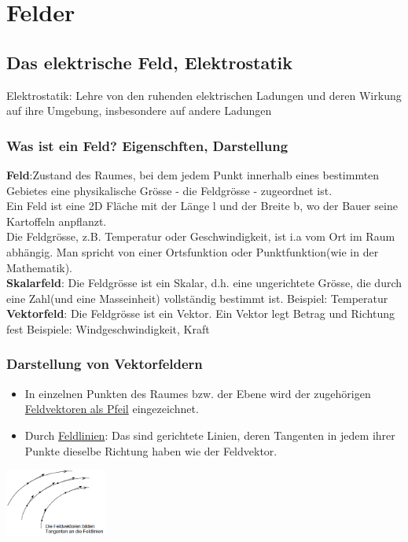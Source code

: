 \section{Felder}
\subsection{Das elektrische Feld, Elektrostatik}
Elektrostatik: Lehre von den ruhenden elektrischen Ladungen und deren Wirkung auf ihre Umgebung, insbesondere auf andere Ladungen\\
\subsubsection{Was ist ein Feld? Eigenschften, Darstellung}
\textbf{Feld}:Zustand des Raumes, bei dem jedem Punkt innerhalb eines bestimmten Gebietes eine physikalische Grösse - die Feldgrösse - zugeordnet ist.\\
Ein Feld ist eine 2D Fläche mit der Länge l und der Breite b, wo der Bauer seine Kartoffeln anpflanzt.\\
Die Feldgrösse, z.B. Temperatur oder Geschwindigkeit, ist i.a vom Ort im Raum abhängig. Man spricht von einer Ortsfunktion oder Punktfunktion(wie in der Mathematik).\\
\textbf{Skalarfeld}: Die Feldgrösse ist ein Skalar, d.h. eine ungerichtete Grösse, die durch eine Zahl(und eine Masseinheit) vollständig bestimmt ist. Beispiel: Temperatur\\

\textbf{Vektorfeld}: Die Feldgrösse ist ein Vektor. Ein Vektor legt Betrag und Richtung fest Beispiele: Windgeschwindigkeit, Kraft\\
\newpage
\subsubsection{Darstellung von Vektorfeldern}
\begin{multicols}{2}
\begin{itemize}
	\item In einzelnen Punkten des Raumes bzw. der Ebene wird der zugehörigen
	\underline{Feldvektoren als Pfeil} eingezeichnet.
	\item Durch \underline{Feldlinien}: Das sind gerichtete Linien, deren Tangenten in jedem ihrer Punkte dieselbe Richtung haben wie der Feldvektor.\\
\end{itemize}
\includegraphics[width=0.25\textwidth]{pics/felder/Feldvektoren}
\end{multicols}
